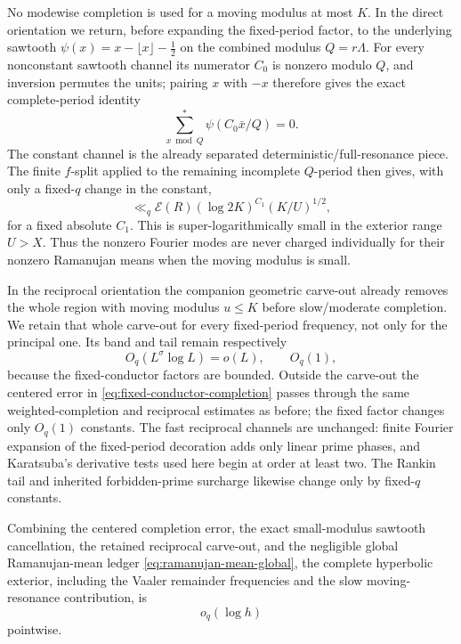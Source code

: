 \documentclass[11pt]{article}
\theoremstyle{definition}
\theoremstyle{remark}
\newcommand{\1}{\mathbf 1}
\begin{document}
No modewise completion is used for a moving modulus at most $K$.  In the
direct orientation we return, before expanding the fixed-period factor, to the
underlying sawtooth $\psi(x)=x-\lfloor x\rfloor-\tfrac12$ on the combined modulus $Q=r\Lambda$.  For every
nonconstant sawtooth channel its numerator $C_0$ is nonzero modulo $Q$, and
inversion permutes the units; pairing $x$ with $-x$ therefore gives the exact
complete-period identity
\begin{equation}\label{eq:fixed-conductor-sawtooth-zero}
\sum_{x\bmod Q}^{*}\psi(C_0\bar x/Q)=0.
\end{equation}
The constant channel is the already separated deterministic/full-resonance
piece.  The finite $f$-split applied to the remaining incomplete $Q$-period
then gives, with only a fixed-$q$ change in the constant,
\begin{equation}\label{eq:fixed-conductor-small-modulus}
\ll_q
\mathcal E(R)(\log 2K)^{C_1}(K/U)^{1/2},
\end{equation}
for a fixed absolute $C_1$.  This is super-logarithmically small in the exterior range $U>X$.  Thus the
nonzero Fourier modes are never charged individually for their nonzero
Ramanujan means when the moving modulus is small.

In the reciprocal orientation the companion geometric carve-out already
removes the whole region with moving modulus $u\le K$ before slow/moderate
completion.  We retain that whole carve-out for every fixed-period frequency,
not only for the principal one.  Its band and tail remain respectively
\[
O_q(L^\sigma\log L)=o(L),
\qquad O_q(1),
\]
because the fixed-conductor factors are bounded.  Outside the carve-out the
centered error in \eqref{eq:fixed-conductor-completion} passes through the same
weighted-completion and reciprocal estimates as before; the fixed factor
changes only $O_q(1)$ constants.  The fast reciprocal channels are unchanged:
finite Fourier expansion of the fixed-period decoration adds only linear prime
phases, and Karatsuba's derivative tests used here \cite[Theorem~1]{Karatsuba1971} begin at order at least two.
The Rankin tail and inherited forbidden-prime surcharge likewise change only
by fixed-$q$ constants.

Combining the centered completion error, the exact small-modulus sawtooth
cancellation, the retained reciprocal carve-out, and the negligible global
Ramanujan-mean ledger \eqref{eq:ramanujan-mean-global}, the complete hyperbolic
exterior, including the Vaaler remainder frequencies and the slow
moving-resonance contribution, is
\begin{equation}\label{eq:exterior-q}
\boxed{o_q(\log h)}
\end{equation}
pointwise.
\end{document}

